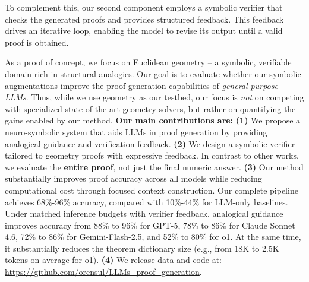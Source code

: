 To complement this, our second component employs a symbolic verifier that checks the generated proofs and provides structured feedback. This feedback drives an iterative loop, enabling the model to revise its output until a valid proof is obtained. 



As a proof of concept, we focus on Euclidean geometry -- a symbolic, verifiable domain rich in structural analogies.
Our goal is to evaluate whether our symbolic augmentations improve the proof-generation capabilities of \emph{general-purpose LLMs}. Thus, while we use geometry as our testbed, our focus is \emph{not} on competing with specialized state-of-the-art geometry solvers, but rather on quantifying the gains enabled by our method.
\textbf{Our main contributions are:}
\textbf{(1)} We propose a neuro-symbolic system that aids LLMs in proof generation by providing analogical guidance and verification feedback.
\textbf{(2)} We design a symbolic verifier tailored to geometry proofs with expressive feedback. In contrast to other works, we evaluate the {\bf entire proof}, not just the final numeric answer.
\textbf{(3)} Our method substantially improves proof accuracy across all models while reducing computational cost through focused context construction. Our complete pipeline achieves 68\%-96\% accuracy, compared with 10\%-44\% for LLM-only baselines. Under matched inference budgets with verifier feedback, analogical guidance improves accuracy from 88\% to 96\% for GPT-5, 78\% to 86\% for Claude Sonnet 4.6, 72\% to 86\% for Gemini-Flash-2.5, and 52\% to 80\% for o1. At the same time, it substantially reduces the theorem dictionary size (e.g., from 18K to 2.5K tokens on average for o1).
\textbf{(4)} We release data and code at: \url{https://github.com/orensul/LLMs_proof_generation}.
 



